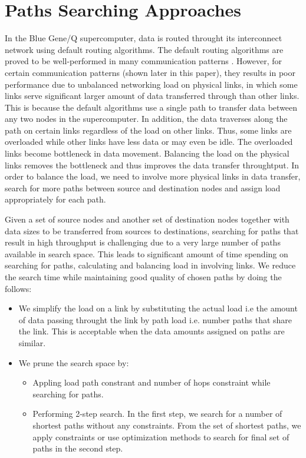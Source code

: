 \section{Paths Searching Approaches}
\label{sec:approach}

In the Blue Gene/Q supercomputer, data is routed throught its interconnect network using default routing algorithms. The default routing algorithms are proved to be well-performed in many communication patterns \cite{Chen:BGQ}. However, for certain communication patterns (shown later in this paper), they results in poor performance due to unbalanced networking load on physical links, in which some links serve significant larger amount of data transferred through than other links. This is because the default algorithms use a single path to transfer data between any two nodes in the supercomputer. In addition, the data traverses along the path on certain links regardless of the load on other links. Thus, some links are overloaded while other links have less data or may even be idle. The overloaded links become bottleneck in data movement. Balancing the load on the physical links removes the bottleneck and thus improves the data transfer throughtput. In order to balance the load, we need to involve more physical links in data transfer, search for more paths between source and destination nodes and assign load appropriately for each path.

Given a set of source nodes and another set of destination nodes together with data sizes to be transferred from sources to destinations, searching for paths that result in high throughput is challenging due to a very large number of paths available in search space. This leads to significant amount of time spending on searching for paths, calculating and balancing load in involving links. We reduce the search time while maintaining good quality of chosen paths by doing the follows:
\begin{itemize}
\item We simplify the load on a link by substituting the actual load i.e the amount of data passing throught the link by path load i.e. number paths that share the link. This is acceptable when the data amounts assigned on paths are similar. 
\item We prune the search space by:
\begin{itemize}
\item Appling load path constrant and number of hops constraint while searching for paths.
\item Performing 2-step search. In the first step, we search for a number of shortest paths without any constraints. From the set of shortest paths, we apply constraints or use optimization methods to search for final set of paths in the second step. 
\end{itemize}
\end{itemize}

